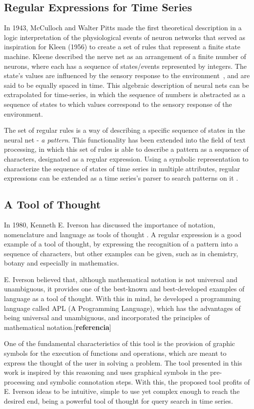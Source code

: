 \subsection{Regular Expressions for Time Series}

In 1943, McCulloch and Walter Pitts made the first theoretical description in a logic interpretation of the physiological events of neuron networks that served as inspiration for Kleen (1956) to create a set of rules that represent a finite state machine. Kleene described the nerve net as an arrangement of a finite number of neurons, where each has a sequence of states/events represented by integers. The state's values are influenced by the sensory response to the environment~\citep{Kleene}, and are said to be equally spaced in time. This algebraic description of neural nets can be extrapolated for time-series, in which the sequence of numbers is abstracted as a sequence of states to which values correspond to the sensory response of the environment. 
\par
The set of regular rules is a way of describing a specific sequence of states in the neural net - \textit{a pattern}. This functionality has been extended into the field of text processing, in which this set of rules is able to describe a pattern as a sequence of characters, designated as a regular expression. Using a symbolic representation to characterize the sequence of states of time series in multiple attributes, regular expressions can be extended as a time series's parser to search patterns on it \citep{Thompson}. 

\subsection{A Tool of Thought}

In 1980, Kenneth E. Iverson has discussed the importance of notation, nomenclature and language as tools of thought \citep{APL1}. A regular expression is a good example of a tool of thought, by expressing the recognition of a pattern into a sequence of characters, but other examples can be given, such as in chemistry, botany and especially in mathematics. 
\par
E. Iverson believed that, although mathematical notation is not universal and unambiguous, it provides one of the best-known and best-developed examples of language as a tool of thought. With this in mind, he developed a programming language called APL (A Programming Language), which has the advantages of being universal and unambiguous, and incorporated the principles of mathematical notation.[\textbf{referencia}]
\par
One of the fundamental characteristics of this tool is the provision of graphic symbols for the execution of functions and operations, which are meant to express the thought of the user in solving a problem. The tool presented in this work is inspired by this reasoning and uses graphical symbols in the pre-processing and symbolic connotation steps. With this, the proposed tool profits of E. Iverson ideas to be intuitive, simple to use yet complex enough to reach the desired end, being a powerful tool of thought for query search in time series. 

